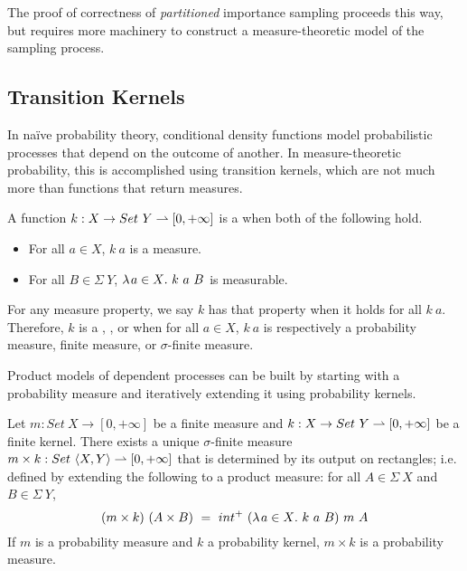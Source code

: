 The proof of correctness of \emph{partitioned} importance sampling proceeds this way, but requires more machinery to construct a measure-theoretic model of the sampling process.

\subsection{Transition Kernels}

In na\"ive probability theory, conditional density functions model probabilistic processes that depend on the outcome of another.
In measure-theoretic probability, this is accomplished using transition kernels, which are not much more than functions that return measures.

\begin{definition}
\label{def:transition-kernel}
A function $k : X \to Set~Y \rightharpoonup [0,+\infty]$ is a  when both of the following hold.
\begin{itemize}
	\item For all $a \in X$, $k~a$ is a measure.
	\item For all $B \in \Sigma~Y$, $\lambda\mspace{2mu}{a \in X}\ldotp\, k~a~B$ is measurable.
\end{itemize}
\end{definition}

For any measure property, we say $k$ has that property when it holds for all $k~a$.
Therefore, $k$ is a , , or  when for all $a \in X$, $k~a$ is respectively a probability measure, finite measure, or $\sigma$-finite measure.

Product models of dependent processes can be built by starting with a probability measure and iteratively extending it using probability kernels.

\begin{lemma}
\label{lem:finite-transition-kernel-products}
Let $m : Set~X \to [0,+\infty]$ be a finite measure and $k : X \to Set~Y \rightharpoonup [0,+\infty]$ be a finite kernel.
There exists a unique $\sigma$-finite measure $m \times k : Set~\langle{X,Y}\rangle \rightharpoonup [0,+\infty]$ that is determined by its output on rectangles; i.e. defined by extending the following to a product measure: for all $A \in \Sigma~X$ and $B \in \Sigma~Y$,
\begin{equation}
	(m \times k)~(A \times B)\ =\ int^+~(\lambda\mspace{2mu}{a \in X}\ldotp\, k~a~B)~m~A
\end{equation}
If $m$ is a probability measure and $k$ a probability kernel, $m \times k$ is a probability measure.
\end{lemma}

